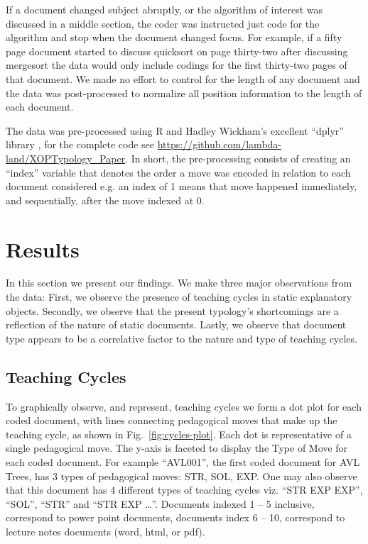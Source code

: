 \documentclass[conference]{IEEEtran}
\begin{document}
If a document changed subject abruptly, or the algorithm of interest was
discussed in a middle section, the coder was instructed just code for the
algorithm and stop when the document changed focus. For example, if a fifty page
document started to discuss quicksort on page thirty-two after discussing
mergesort the data would only include codings for the first thirty-two pages of
that document. We made no effort to control for the length of any document and
the data was post-processed to normalize all position information to the
length of each document.

The data was pre-processed using R and Hadley Wickham's excellent ``dplyr''
library \cite{Dplyr}, for the complete code see
\url{https://github.com/lambda-land/XOPTypology_Paper}. In short, the
pre-processing consists of creating an ``index'' variable that denotes the order
a move was encoded in relation to each document considered e.g. an index of 1
means that move happened immediately, and sequentially, after the move indexed
at 0.

\section{Results}
In this section we present our findings. We make three major observations from
the data: First, we observe the presence of teaching cycles in static
explanatory objects. Secondly, we observe that the present typology's
shortcomings are a reflection of the nature of static documents. Lastly, we
observe that document type appears to be a correlative factor to
the nature and type of teaching cycles.


\subsection{Teaching Cycles}
To graphically observe, and represent, teaching cycles we form a dot plot for
each coded document, with lines connecting pedagogical moves that make up the
teaching cycle, as shown in Fig.~\ref{fig:cycles-plot}.
%
Each dot is representative of a single pedagogical move. The y-axis is faceted to display
the Type of Move for each coded document. For example ``AVL001'', the first
coded document for AVL Trees, has 3 types of pedagogical moves: STR, SOL, EXP.
One may also observe that this document has 4 different types of teaching cycles
viz. ``STR EXP EXP'', ``SOL'', ``STR'' and ``STR EXP \ldots''. Documents
indexed 1 -- 5 inclusive, correspond to power point documents, documents index 6
-- 10, correspond to lecture notes documents (word, html, or pdf).
\end{document}
